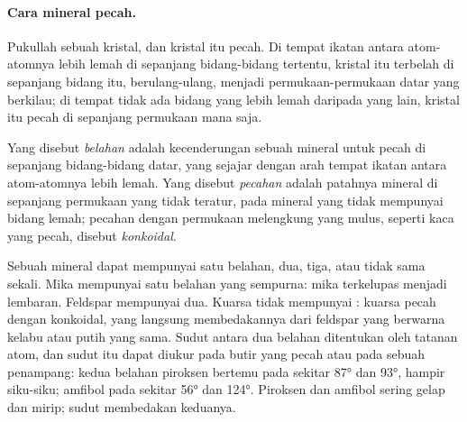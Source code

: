 \paragraph{Cara mineral pecah.} Pukullah sebuah kristal, dan kristal itu pecah.
Di tempat ikatan antara atom-atomnya lebih lemah di sepanjang bidang-bidang
tertentu, kristal itu terbelah di sepanjang bidang itu, berulang-ulang, menjadi
permukaan-permukaan datar yang berkilau; di tempat tidak ada bidang yang lebih
lemah daripada yang lain, kristal itu pecah di sepanjang permukaan mana saja.

\begin{definition}\label{def:g11:minerals:cleavage}
Yang disebut \emph{belahan} adalah kecenderungan sebuah
mineral untuk pecah di sepanjang bidang-bidang datar, yang sejajar dengan arah
tempat ikatan antara atom-atomnya lebih lemah. Yang disebut
\emph{pecahan} adalah patahnya mineral di sepanjang
permukaan yang tidak teratur, pada mineral yang tidak mempunyai bidang lemah;
pecahan dengan permukaan melengkung yang mulus, seperti kaca yang pecah, disebut
\emph{konkoidal}.
\end{definition}

Sebuah mineral dapat mempunyai satu belahan, dua, tiga, atau tidak sama sekali.
Mika mempunyai satu belahan yang sempurna: mika terkelupas menjadi lembaran.
Feldspar mempunyai dua. Kuarsa tidak mempunyai : kuarsa pecah dengan
 konkoidal, yang langsung membedakannya dari feldspar yang berwarna kelabu
atau putih yang sama. Sudut antara dua belahan ditentukan oleh tatanan atom, dan
sudut itu dapat diukur pada butir yang pecah atau pada sebuah penampang: kedua
belahan piroksen bertemu pada sekitar \ang{87} dan \ang{93}, hampir siku-siku;
 amfibol pada sekitar \ang{56} dan \ang{124}. Piroksen dan amfibol sering
gelap dan mirip; sudut  membedakan keduanya.

